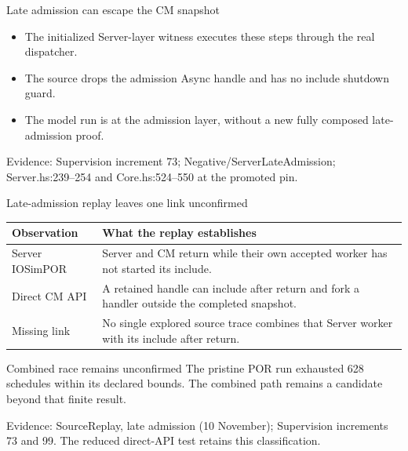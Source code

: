 \documentclass[11pt,aspectratio=169]{beamer}
\newcommand{\evidence}[1]{\vfill{\fontsize{7}{8}\selectfont\color{Muted}Evidence: #1\par}}
\begin{document}
\begin{frame}{Late admission can escape the CM snapshot}
\centering
{}
\par\vspace{5mm}
\begin{itemize}\setlength\itemsep{2.5mm}
\item The initialized Server-layer witness executes these steps through the real dispatcher.
\item The source drops the admission Async handle and has no include shutdown guard.
\item The model run is at the admission layer, without a new fully composed late-admission proof.
\end{itemize}
\evidence{Supervision increment 73; Negative/ServerLateAdmission; Server.hs:239--254 and Core.hs:524--550 at the promoted pin.}
\end{frame}

\begin{frame}{Late-admission replay leaves one link unconfirmed}
\small\renewcommand{\arraystretch}{1.2}
\begin{tabularx}{\textwidth}{@{}P{28mm}Y@{}}
\toprule
Observation & What the replay establishes \\ \midrule
Server IOSimPOR & Server and CM return while their own accepted worker has not started its include. \\[2mm]
Direct CM API & A retained handle can include after return and fork a handler outside the completed snapshot. \\[2mm]
Missing link & No single explored source trace combines that Server worker with its include after return. \\[2mm]
\bottomrule
\end{tabularx}\begin{alertblock}{Combined race remains unconfirmed}
The pristine POR run exhausted 628 schedules within its declared bounds. The combined path remains a candidate beyond that finite result.
\end{alertblock}
\evidence{SourceReplay, late admission (10 November); Supervision increments 73 and 99. The reduced direct-API test retains this classification.}
\end{frame}
\end{document}
